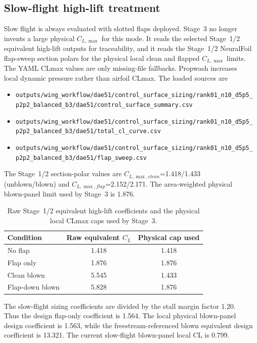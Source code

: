 \documentclass[11pt]{article}
\begin{document}
\subsection{Slow-flight high-lift treatment}
Slow flight is always evaluated with slotted flaps deployed. Stage~3 no longer invents a large physical \(C_{L,\max}\) for this mode. It reads the selected Stage~1/2 equivalent high-lift outputs for traceability, and it reads the Stage~1/2 NeuralFoil flap-sweep section polars for the physical local clean and flapped \(C_{L,\max}\) limits. The YAML CLmax values are only missing-file fallbacks. Propwash increases local dynamic pressure rather than airfoil CLmax. The loaded sources are
\begin{itemize}[leftmargin=*]
\item \texttt{outputs/wing\_workflow/dae51/control\_surface\_sizing/rank01\_n10\_d5p5\_p2p2\_balanced\_b3/dae51/control\_surface\_summary.csv}
\item \texttt{outputs/wing\_workflow/dae51/control\_surface\_sizing/rank01\_n10\_d5p5\_p2p2\_balanced\_b3/dae51/total\_cl\_curve.csv}
\item \texttt{outputs/wing\_workflow/dae51/control\_surface\_sizing/rank01\_n10\_d5p5\_p2p2\_balanced\_b3/dae51/flap\_sweep.csv}
\end{itemize}
The Stage~1/2 section-polar values are \(C_{L,\max,clean}\)=1.418/1.433 (unblown/blown) and \(C_{L,\max,flap}\)=2.152/2.171. The area-weighted physical blown-panel limit used by Stage~3 is 1.876.
\begin{table}[H]
\centering
\begin{tabular}{lcc}
\toprule
Condition & Raw equivalent \(C_L\) & Physical cap used \\
\midrule
No flap & 1.418 & 1.418 \\
Flap only & 1.876 & 1.876 \\
Clean blown & 5.545 & 1.433 \\
Flap-down blown & 5.828 & 1.876 \\
\bottomrule
\end{tabular}
\caption{Raw Stage~1/2 equivalent high-lift coefficients and the physical local CLmax caps used by Stage~3.}
\label{tab:stage3-clmax}
\end{table}
The slow-flight sizing coefficients are divided by the stall margin factor 1.20. Thus the design flap-only coefficient is 1.564. The local physical blown-panel design coefficient is 1.563, while the freestream-referenced blown equivalent design coefficient is 13.321. The current slow-flight blown-panel local CL is 0.799.
\end{document}
